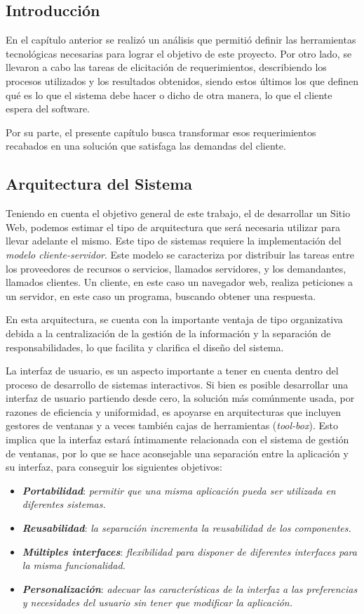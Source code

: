 \documentclass[11pt,oneside]{book}
\begin{document}
\subsection{Introducción}
En el capítulo anterior se realizó un análisis que permitió definir las herramientas tecnológicas necesarias para lograr el objetivo de este proyecto. Por otro lado, se llevaron a cabo las tareas de elicitación de requerimientos, describiendo los procesos utilizados y los resultados obtenidos, siendo estos últimos los que definen qué es lo que el sistema debe hacer o dicho de otra manera, lo que el cliente espera del software. 

Por su parte, el presente capítulo busca transformar esos requerimientos recabados en una solución que satisfaga las demandas del cliente.

\subsection{Arquitectura del Sistema}
Teniendo en cuenta el objetivo general de este trabajo, el de desarrollar un Sitio Web, podemos estimar el tipo de arquitectura que será necesaria utilizar para llevar adelante el mismo. Este tipo de sistemas requiere la implementación del \textit{modelo cliente-servidor}. Este modelo se caracteriza por distribuir las tareas entre los proveedores de recursos o servicios, llamados servidores, y los demandantes, llamados clientes. Un cliente, en este caso un navegador web, realiza peticiones a un servidor, en este caso un programa, buscando obtener una respuesta.

En esta arquitectura, se cuenta con la importante ventaja de tipo organizativa debida a la centralización de la gestión de la información y la separación de responsabilidades, lo que facilita y clarifica el diseño del sistema.

La interfaz de usuario, es un aspecto importante a tener en cuenta dentro del proceso de desarrollo de sistemas interactivos. Si bien es posible desarrollar una interfaz de usuario partiendo desde cero, la solución más comúnmente usada, por razones de eficiencia y uniformidad, es apoyarse en arquitecturas que incluyen gestores de ventanas y a veces también cajas de herramientas (\textit{tool-box}). Esto implica que la interfaz estará íntimamente relacionada con el sistema de gestión de ventanas, por lo que se hace aconsejable una separación entre la aplicación y su interfaz, para conseguir los siguientes objetivos:
\begin{itemize}
\item \textit{\textbf{Portabilidad}}: \textit{permitir que una misma aplicación pueda ser utilizada en diferentes sistemas.}
\item \textit{\textbf{Reusabilidad}}: \textit{la separación incrementa la reusabilidad de los componentes.}
\item \textit{\textbf{Múltiples interfaces}}: \textit{flexibilidad para disponer de diferentes interfaces para la misma funcionalidad.}
\item \textit{\textbf{Personalización}}: \textit{adecuar las características de la interfaz a las preferencias y necesidades del usuario sin tener que modificar la aplicación.}
\end{itemize}
\end{document}
